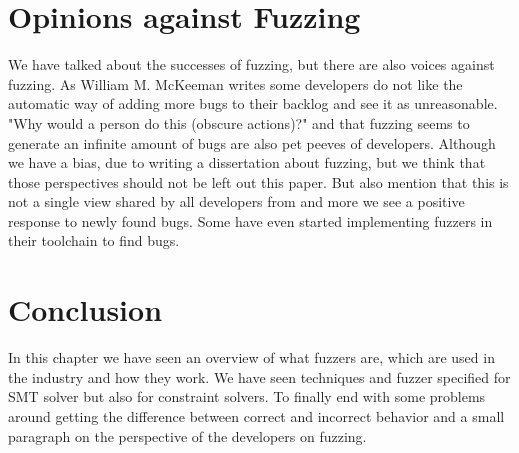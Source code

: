 \section{Opinions against Fuzzing}
\label{fuzzing:OpinionsAgainstFuzzing}
We have talked about the successes of fuzzing, but there are also voices against fuzzing. As William M. McKeeman \cite{39differentialTesting} writes some developers do not like the automatic way of adding more bugs to their backlog and see it as unreasonable. "Why would a person do this (obscure actions)?" and that fuzzing seems to generate an infinite amount of bugs are also pet peeves of developers. 
Although we have a bias, due to writing a dissertation about fuzzing, but we think that those perspectives should not be left out this paper. But also mention that this is not a single view shared by all developers from \cite{43YinYang, 42FalconFuzzingConfigurationSettingsAndNormal, 47zhang2019finding} and more we see a positive response to newly found bugs. Some have even started implementing fuzzers \cite{44Stringfuzz} in their toolchain to find bugs.

\section{Conclusion}
\label{fuzzing:conclusion}
In this chapter we have seen an overview of what fuzzers are, which are used in the industry and how they work. We have seen techniques and fuzzer specified for SMT solver but also for constraint solvers. To finally end with some problems around getting the difference between correct and incorrect behavior and a small paragraph on the perspective of the developers on fuzzing.

